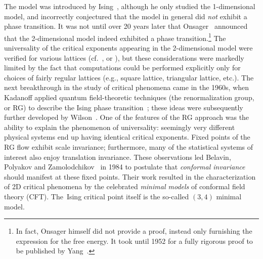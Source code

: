 \documentclass[pdftex]{sigma}
\numberwithin{equation}{section}
\begin{document}
The model was introduced by Ising~\cite{Ising}, although he only studied the 1-dimensional model, and incorrectly
conjectured that the model in general did \textit{not} exhibit a phase transition. It was not until over 20 years later that Onsager~\cite{Onsager} announced that the
2-dimensional model indeed exhibited a phase transition.\footnote{In fact, Onsager himself did not provide a proof, instead only furnishing the expression for the free energy. It took until 1952 for a fully rigorous proof to be published by Yang~\cite{Yang}.} The universality of the critical exponents appearing in the 2-dimensional model were verified
for various lattices (cf.~\cite{MW}, or \cite[Chapter~11 and references therein]{Baxter}), but these considerations were markedly limited by the fact that computations could be performed explicitly only
for choices of fairly regular lattices (e.g., square lattice, triangular lattice, etc.). The next breakthrough in the study of critical phenomena came in the 1960s, when Kadanoff applied quantum field-theoretic techniques (the renormalization group, or RG) to describe the Ising phase transition~\cite{Kadanoff}; these ideas were subsequently further developed by Wilson~\cite{Wilson1,Wilson2}.
One of the features of the RG approach was the ability to explain the phenomenon of universality: seemingly very different physical systems end up having identical critical exponents. Fixed points of the RG flow exhibit scale invariance; furthermore, many of the statistical systems of interest also enjoy translation invariance. These observations led Belavin, Polyakov and Zamolodchikov~\cite{BPZ} in 1984 to postulate that \textit{conformal invariance} should manifest at these fixed points. Their work resulted in the characterization of 2D critical phenomena by the celebrated \textit{minimal models} of conformal field theory (CFT). The~Ising critical point itself is the so-called $(3,4)$ minimal model.
\end{document}
